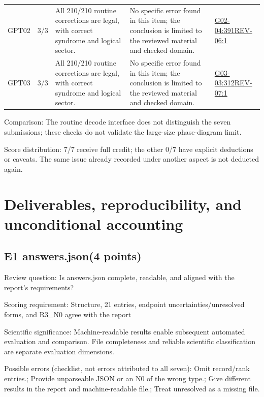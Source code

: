 \documentclass[11pt,a4paper]{article}
\begin{document}
{\begin{longtable}
{}GPT02 & 3/\allowbreak{}3 & All 210/\allowbreak{}210 routine corrections are legal,\allowbreak{} with correct syndrome and logical sector. & No specific error found in this item; the conclusion is limited to the reviewed material and checked domain. & \hyperref[src:G02-04]{G02-04:391}\newline \hyperref[src:REV-06]{REV-06:1}\tabularnewline
{}GPT03 & 3/\allowbreak{}3 & All 210/\allowbreak{}210 routine corrections are legal,\allowbreak{} with correct syndrome and logical sector. & No specific error found in this item; the conclusion is limited to the reviewed material and checked domain. & \hyperref[src:G03-03]{G03-03:312}\newline \hyperref[src:REV-07]{REV-07:1}\tabularnewline
\bottomrule
\end{longtable}
}
Comparison: The routine decode interface does not distinguish the seven submissions; these checks do not validate the large-size phase-diagram limit.

Score distribution: 7/\allowbreak{}7 receive full credit; the other 0/\allowbreak{}7 have explicit deductions or caveats. The same issue already recorded under another aspect is not deducted again.

\clearpage
\section{Deliverables,\allowbreak{} reproducibility,\allowbreak{} and unconditional accounting}
\subsection{E1 answers.json(4 points)}
\label{aspect:E1}
Review question: Is answers.json complete,\allowbreak{} readable,\allowbreak{} and aligned with the report's requirements?

Scoring requirement: Structure,\allowbreak{} 21 entries,\allowbreak{} endpoint uncertainties/\allowbreak{}unresolved forms,\allowbreak{} and R3\_N0 agree with the report

Scientific significance: Machine-readable results enable subsequent automated evaluation and comparison. File completeness and reliable scientific classification are separate evaluation dimensions.

Possible errors (checklist,\allowbreak{} not errors attributed to all seven): Omit record/\allowbreak{}rank entries.; Provide unparseable JSON or an N0 of the wrong type.; Give different results in the report and machine-readable file.; Treat unresolved as a missing file.
\end{document}
